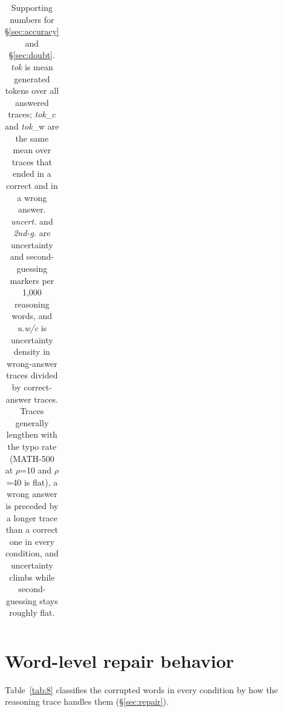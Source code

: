 \documentclass[11pt]{article}
\begin{document}
\begin{table}[t]
{\begin{tabular}{lrrrrrrrrrrrrrrrrrr}
\bottomrule
\end{tabular}}
\caption{Supporting numbers for \S\ref{sec:accuracy} and \S\ref{sec:doubt}. \emph{tok} is mean generated tokens over all answered traces; \emph{tok}\_c and \emph{tok}\_w are the same mean over traces that ended in a correct and in a wrong answer. \emph{uncert.} and \emph{2nd-g.} are uncertainty and second-guessing markers per 1,000 reasoning words, and \emph{u.w/c} is uncertainty density in wrong-answer traces divided by correct-answer traces. Traces generally lengthen with the typo rate (MATH-500 at $\rho$=10 and $\rho$=40 is flat), a wrong answer is preceded by a longer trace than a correct one in every condition, and uncertainty climbs while second-guessing stays roughly flat.}
\label{tab:7}
\end{table}


\section{Word-level repair behavior}

Table~\ref{tab:8} classifies the corrupted words in every condition by how the reasoning trace handles them (\S\ref{sec:repair}).
\end{document}
